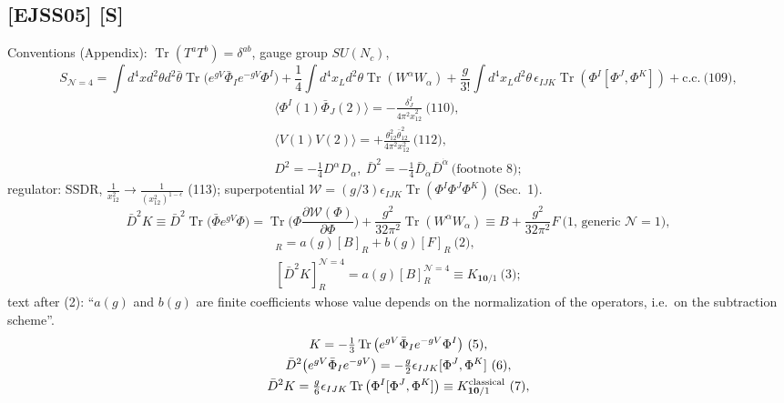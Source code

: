 \documentclass[10pt]{article}
\begin{document}
\subsection{[EJSS05] [S]}
Conventions (Appendix): $\operatorname{Tr}(T^aT^b)=\delta^{ab}$, gauge group $SU(N_c)$,
\begin{equation*}
S_{\mathcal N=4}=\int d^4xd^2\theta d^2\bar\theta\operatorname{Tr}\big(e^{gV}\bar\Phi_Ie^{-gV}\Phi^I\big)+\frac14\int d^4x_Ld^2\theta\operatorname{Tr}(W^\alpha W_\alpha)+\frac{g}{3!}\int d^4x_Ld^2\theta\,\epsilon_{IJK}\operatorname{Tr}(\Phi^I[\Phi^J,\Phi^K])+\text{c.c.}\ \text{(109)},
\end{equation*}
\begin{gather*}
\langle\Phi^I(1)\bar\Phi_J(2)\rangle=-\frac{\delta^I_J}{4\pi^2\hat x_{12}^2}\ \text{(110)},\\ \langle V(1)V(2)\rangle=+\frac{\theta_{12}^2\bar\theta_{12}^2}{4\pi^2x_{12}^2}\ \text{(112)},\\ D^2=-\tfrac14D^\alpha D_\alpha,\ \bar D^2=-\tfrac14\bar D_{\dot\alpha}\bar D^{\dot\alpha}\ \text{(footnote 8)};
\end{gather*}
regulator: SSDR, $\frac1{x_{12}^2}\to\frac{1}{(x_{12}^2)^{1-\epsilon}}$ (113); superpotential $\mathcal W=(g/3)\epsilon_{IJK}\operatorname{Tr}(\Phi^I\Phi^J\Phi^K)$ (Sec.\ 1).
\begin{equation*}
\bar D^2K\equiv\bar D^2\operatorname{Tr}\big(\bar\Phi e^{gV}\Phi\big)=\operatorname{Tr}\Big(\Phi\frac{\partial\mathcal W(\Phi)}{\partial\Phi}\Big)+\frac{g^2}{32\pi^2}\operatorname{Tr}(W^\alpha W_\alpha)\equiv B+\frac{g^2}{32\pi^2}F\ \text{(1, generic $\mathcal N=1$)},
\end{equation*}
\begin{gather*}
[\bar D^2K]_R=a(g)[B]_R+b(g)[F]_R\ \text{(2)},\\ [\bar D^2K]^{\mathcal N=4}_R=a(g)[B]^{\mathcal N=4}_R\equiv K_{\mathbf{10}/1}\ \text{(3)};
\end{gather*}
text after (2): ``$a(g)$ and $b(g)$ are finite coefficients whose value depends on the normalization of the operators, i.e.\ on the subtraction scheme''.
\begin{gather*}
K=-\tfrac13\operatorname{Tr}\big(e^{gV}\bar\Phi_Ie^{-gV}\Phi^I\big)\ \text{(5)},\\ \bar D^2\big(e^{gV}\bar\Phi_Ie^{-gV}\big)=-\tfrac g2\epsilon_{IJK}[\Phi^J,\Phi^K]\ \text{(6)},\\ \bar D^2K=\tfrac g6\epsilon_{IJK}\operatorname{Tr}\big(\Phi^I[\Phi^J,\Phi^K]\big)\equiv K^{\rm classical}_{\mathbf{10}/1}\ \text{(7)},
\end{gather*}
\end{document}
